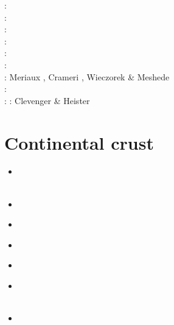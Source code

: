 \begin{scriptsize}
\twothousandtwelve: \cite{crsg12}\cite{chgv12}\cite{krwd12}\cite{may12}\cite{gerb12}\cite{asmo12}\\
\twothousandthirteen: \cite{chtl13}\cite{kemk13}\cite{gemd13}\cite{hutm13}\\
\twothousandfourteen: \cite{thmk14}\cite{mabl14}\cite{lopp14}\cite{stlh14}\\
\twothousandfifteen: \cite{lelk15}\cite{rumi15}\cite{chpe15}\cite{mabl15}\\
\twothousandsixteen: \cite{dumy16}\cite{blmp16}\\
\twothousandseventeen: \cite{robh17}\cite{wisv17}\cite{majc17}\\
\twothousandeighteen: Meriaux \etal \cite{memm18}, Crameri \cite{cram18}, Wieczorek \& Meshede \cite{wime18}\\
\twothousandnineteen: \cite{liki19}\cite{demh19}\cite{galb19}\cite{frtv19}\cite{yuwa19}\cite{ropu19}\\
\twothousandtwenty: \cite{homb20}\cite{trlb20}\cite{gadb20}\cite{jaca20a,jaca20b} 
\twothousandtwentyone: Clevenger \& Heister \cite{clhe21}
\end{scriptsize}

\section{Continental crust} 

\begin{scriptsize}
\begin{itemize}
\item[\nineteeneightysix] 
\textcite{chap86} \\
\textcite{bart86} \\
\item[\nineteeneightynine] 
\textcite{ord89} \\
\item[\nineteenninetyfour] 
\textcite{sawy94} \\
\item[\twothousandone] 
\textcite{dohe01} \\
\item[\twothousandfour] 
\textcite{gepm04} \\
\item[\twothousandthirteen] 
\textcite{cavg13} \\
\textcite{tibb13} \\
\item[\twothousandnineteen] 
\textcite{scmw19} 
\end{itemize}
\end{scriptsize}


